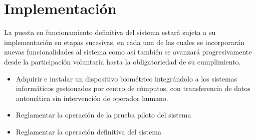 \documentclass[a4paper, 11pt]{article} %
\begin{document}
\section*{Implementación}
La puesta en funcionamiento definitiva del sistema estará sujeta a su implementación en etapas sucesivas, en cada una de las cuales se incorporarán nuevas funcionalidades al sistema como así también se avanzará progresivamente desde la participación voluntaria hasta la obligatoriedad de su cumplimiento.\\

\begin{itemize}
	\item Adquirir e instalar un dispositivo biométrico integrándolo a los sistemas informáticos gestionados por centro de cómputos, con transferencia de datos automática sin intervención de operador humano.
	\item Reglamentar la operación de la prueba piloto del sistema
	\item Reglamentar la operación definitiva del sistema
\end{itemize}
\end{document}
